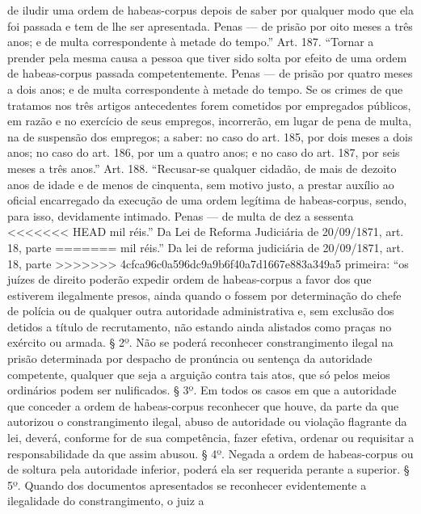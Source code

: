 {  de iludir uma ordem de habeas-corpus depois de saber por qualquer modo
  que ela foi passada e tem de lhe ser apresentada. Penas --- de prisão
  por oito meses a três anos; e de multa correspondente à metade do
  tempo.'' Art. 187. ``Tornar a prender pela mesma causa a pessoa que
  tiver sido solta por efeito de uma ordem de habeas-corpus passada
  competentemente. Penas --- de prisão por quatro meses a dois anos; e de
  multa correspondente à metade do tempo. Se os crimes de que tratamos
  nos três artigos antecedentes forem cometidos por empregados
  públicos, em razão e no exercício de seus empregos, incorrerão, em
  lugar de pena de multa, na de suspensão dos empregos; a saber: no caso
  do art. 185, por dois meses a dois anos; no caso do art. 186, por um a
  quatro anos; e no caso do art. 187, por seis meses a três anos.'' Art.
  188. ``Recusar-se qualquer cidadão, de mais de dezoito anos de idade e
  de menos de cinquenta, sem motivo justo, a prestar auxílio ao oficial
  encarregado da execução de uma ordem legítima de habeas-corpus, sendo,
  para isso, devidamente intimado. Penas --- de multa de dez a sessenta
<<<<<<< HEAD
  mil réis.'' Da Lei de Reforma Judiciária de 20/09/1871, art. 18, parte
=======
  mil réis.'' Da lei de reforma judiciária de 20/09/1871, art. 18, parte
>>>>>>> 4cfca96c0a596dc9a9b6f40a7d1667e883a349a5
  primeira: ``os juízes de direito poderão expedir ordem de
  habeas-corpus a favor dos que estiverem ilegalmente presos, ainda
  quando o fossem por determinação do chefe de polícia ou de qualquer
  outra autoridade administrativa e, sem exclusão dos detidos a título
  de recrutamento, não estando ainda alistados como praças no exército
  ou armada. § 2º. Não se poderá reconhecer constrangimento ilegal na
  prisão determinada por despacho de pronúncia ou sentença da autoridade
  competente, qualquer que seja a arguição contra tais atos, que só
  pelos meios ordinários podem ser nulificados. § 3º. Em todos os casos
  em que a autoridade que conceder a ordem de habeas-corpus reconhecer
  que houve, da parte da que autorizou o constrangimento ilegal, abuso
  de autoridade ou violação flagrante da lei, deverá, conforme for de
  sua competência, fazer efetiva, ordenar ou requisitar a
  responsabilidade da que assim abusou. § 4º. Negada a ordem de
  habeas-corpus ou de soltura pela autoridade inferior, poderá ela ser
  requerida perante a superior. § 5º. Quando dos documentos apresentados
  se reconhecer evidentemente a ilegalidade do constrangimento, o juiz a
}

